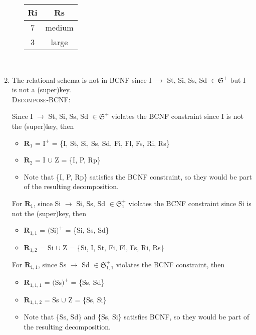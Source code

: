 \documentclass[12pt]{article}
\begin{document}
\begin{enumerate}
\begin{itemize}
                \begin{center}
                  \begin{tabular}{c c }
                    \hline
                    Ri & Rs \\
                    \hline
                    7  & medium \\
                    3  & large \\
                    \hline
                  \end{tabular}
                \end{center}
        \end{itemize}
  \ \\

  \item The relational schema is not in BCNF since I $\longrightarrow$ St, Si,
        Ss, Sd $\in \mathfrak{S}^+$ but I is not a (super)key. \\

        \textsc{Decompose-BCNF}:

        Since I $\longrightarrow$ St, Si, Ss, Sd $\in \mathfrak{S}^+$ violates
        the BCNF constraint since I is not the (super)key, then
        \begin{itemize}
          \item $\textbf{R}_1$ = $\text{I}^+$ 
                               = \{I, St, Si, Ss, Sd, Fi, Fl, Fs, Ri, Rs\}
          \item $\textbf{R}_2$ = I $\cup$ Z
                               = \{I, P, Rp\}
          \item Note that \{I, P, Rp\} satisfies the BCNF constraint, so they
                would be part of the resulting decomposition.
        \end{itemize}

        For $\textbf{R}_1$, since Si $\longrightarrow$ Si, Ss, Sd $\in
        \mathfrak{S}_1^+$ violates the BCNF constraint since Si is not the
        (super)key, then
        \begin{itemize}
          \item $\textbf{R}_{1, 1}$ = $\text{(Si)}^+$
                                    = \{Si, Ss, Sd\}
          \item $\textbf{R}_{1, 2}$ = Si $\cup$ Z
                                    = \{Si, I, St, Fi, Fl, Fs, Ri, Rs\}
        \end{itemize}

        For $\textbf{R}_{1,1}$, since Ss $\longrightarrow$ Sd $\in
        \mathfrak{S}_{1,1}^+$ violates the BCNF constraint, then
        \begin{itemize}
          \item $\textbf{R}_{1,1,1}$ = $\text{(Ss)}^+$
                                     = \{Ss, Sd\}
          \item $\textbf{R}_{1,1,2}$ = Ss $\cup$ Z
                                     = \{Ss, Si\}
          \item Note that \{Ss, Sd\} and \{Ss, Si\} satisfies BCNF, so they
                would be part of the resulting decomposition.
        \end{itemize}


\end{enumerate}
\end{document}
